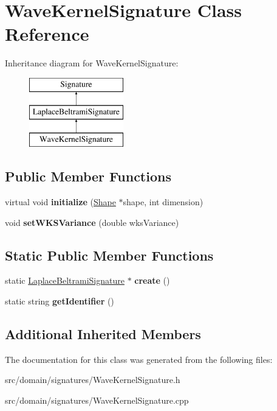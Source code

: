 \hypertarget{class_wave_kernel_signature}{}\section{Wave\+Kernel\+Signature Class Reference}
\label{class_wave_kernel_signature}
Inheritance diagram for Wave\+Kernel\+Signature\+:\begin{figure}[H]
\begin{center}
\leavevmode
\includegraphics[height=3.000000cm]{class_wave_kernel_signature}
\end{center}
\end{figure}
\subsection*{Public Member Functions}
\begin{DoxyCompactItemize}
\item 
\hypertarget{class_wave_kernel_signature_a9691a848f3f3c13a2e57861980b7e66a}{}virtual void {\bfseries initialize} (\hyperlink{class_shape}{Shape} $\ast$shape, int dimension)\label{class_wave_kernel_signature_a9691a848f3f3c13a2e57861980b7e66a}

\item 
\hypertarget{class_wave_kernel_signature_a9f4368ea4f41f87b96cda7e42e07980f}{}void {\bfseries set\+W\+K\+S\+Variance} (double wks\+Variance)\label{class_wave_kernel_signature_a9f4368ea4f41f87b96cda7e42e07980f}

\end{DoxyCompactItemize}
\subsection*{Static Public Member Functions}
\begin{DoxyCompactItemize}
\item 
\hypertarget{class_wave_kernel_signature_a5c89bee21b5c9bb821845aff516dcb48}{}static \hyperlink{class_laplace_beltrami_signature}{Laplace\+Beltrami\+Signature} $\ast$ {\bfseries create} ()\label{class_wave_kernel_signature_a5c89bee21b5c9bb821845aff516dcb48}

\item 
\hypertarget{class_wave_kernel_signature_a9f7be895ffcefc2a7b2abf19ac3c5edf}{}static string {\bfseries get\+Identifier} ()\label{class_wave_kernel_signature_a9f7be895ffcefc2a7b2abf19ac3c5edf}

\end{DoxyCompactItemize}
\subsection*{Additional Inherited Members}


The documentation for this class was generated from the following files\+:\begin{DoxyCompactItemize}
\item 
src/domain/signatures/Wave\+Kernel\+Signature.\+h\item 
src/domain/signatures/Wave\+Kernel\+Signature.\+cpp\end{DoxyCompactItemize}
